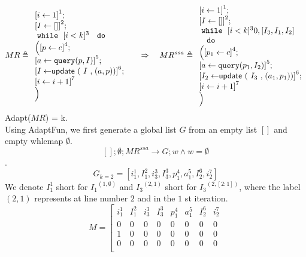 \documentclass[a4paper,11pt]{article}
\newcommand{\THESYSTEM}{\textsf{AdaptFun}}
\begin{document}
%
\begin{example}
{
\[
MR \triangleq
\begin{array}{l}
    \left[i \leftarrow 1 \right]^1 ; \\
    \left[I \leftarrow [] \right]^2; \\
   \ewhile ~ [i < k]^{3} 
    \ ~ \edo ~ \\ \Big(
    \left[p \leftarrow c \right]^4 ; \\
    \left[a \leftarrow \query(p, I) \right]^5; \\
    \left[I \leftarrow \eupdt( {I}, (a, p))  \right]^6 ; \\
    \left[i \leftarrow i + 1 \right]^7 \\
    \Big) 
\end{array}
%
~~~~ \Rightarrow ~~~
%
MR^{ssa} \triangleq
\begin{array}{l}
    \left[i \leftarrow 1 \right]^1 ; \\
   \left[I \leftarrow [] \right]^2; \\
   \ewhile ~ [i < k]^{3} 0, [I_3,I_1,I_2] \\ 
    \ ~ \edo ~ \\ \Big(
    \left[p_1 \leftarrow c \right]^4 ; \\
    \left[a \leftarrow \query(p_1, I_2) \right]^5; \\
    \left[I_2 \leftarrow \eupdt( {I_3}, (a_1, p_1))  \right]^6;\\
    \left[i \leftarrow i + 1 \right]^7 \\
    \Big) 
\end{array}
\]
}
%
%
%
Adapt($MR$) = k.
\\
%
{
Using \THESYSTEM, we first generate a global list $G$ from an empty list $[]$ and empty whlemap $\emptyset$.
 \[[]; \emptyset; MR^{ssa} \to G; w  \land w = \emptyset\].
 \[
 G_{k=2} = 
 \left[
 i_1^{1}, I_1^2, i_3^3, I_3^3, p_1^4, a_1^5, I_2^6, i_2^7
\right] 
\]
  We denote $I_1^{1}$ short for ${I_1}^{(1,\emptyset)}$ and ${I_3}^{(2,1)}$ short for ${I_3}^{(2,[2:1])}$, where the label $(2, 1)$ represents at line number $2$ and in the $1$ st iteration.
  }
{
	\[
M =  \left[ \begin{matrix}
   i_1^{1} & I_1^2 & i_3^3 & I_3^3 & p_1^4 & a_1^5 & I_2^6 & i_2^7\\
 0 & 0 & 0 & 0 & 0 & 0 & 0 & 0 \\
 1 & 0 & 0 & 0 & 0 & 0 & 0 & 0 \\
 0 & 0 & 0 & 0 & 0 & 0 & 0 & 0 \\

\end{matrix}\]}
\end{example}
\end{document}
